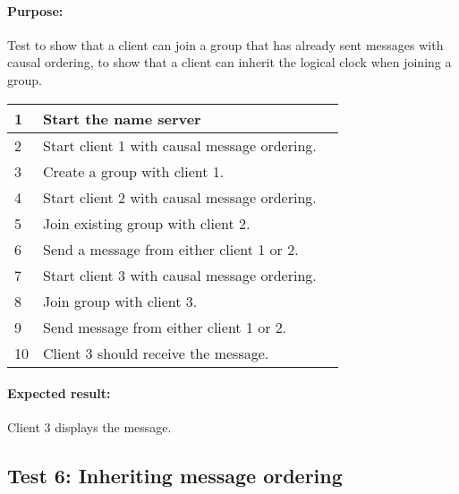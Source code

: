 \paragraph{Purpose: } Test to show that a client can join a group that has already sent messages with causal ordering,
to show that a client can inherit the logical clock when joining a group.
\begin{table}[h!]
	\begin{tabularx}{\textwidth}{|l|X|p{8pt}|}
		\hline
		1 & Start the name server & \\
		\hline
		2 & Start client 1 with causal message ordering. & \\
		\hline
		3 & Create a group with client 1. & \\
		\hline
		4 & Start client   2 with causal message ordering. & \\
		\hline
		5 & Join existing group with client 2.& \\
		\hline
		6 & Send a message from either client 1 or 2. & \\
		\hline
		7 & Start client   3 with causal message ordering. & \\
		\hline		
		8 & Join group with client 3. & \\
		\hline		
		9 & Send message from either client 1 or 2. & \\
		\hline		
		10 & Client 3 should receive the message. & \\
		\hline		
	\end{tabularx}
\end{table}

\paragraph{Expected result:} Client 3 displays the message.


\subsection*{Test 6: Inheriting message ordering}
